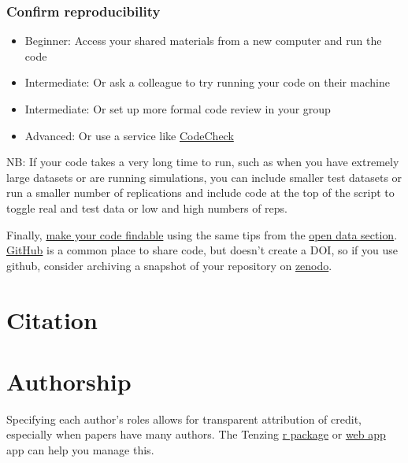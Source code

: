 \documentclass[
  oneside]{book}
\providecommand{\tightlist}{%
  \setlength{\itemsep}{0pt}\setlength{\parskip}{0pt}}
\begin{document}
\hypertarget{confirm-reproducibility}{%
\subsection{Confirm reproducibility}\label{confirm-reproducibility}}

\begin{itemize}
\tightlist
\item
  {Beginner}: Access your shared materials from a new computer and run the code
\item
  {Intermediate}: Or ask a colleague to try running your code on their machine
\item
  {Intermediate}: Or set up more formal code review \citep{vable2021code} in your group
\item
  {Advanced}: Or use a service like \href{https://codecheck.org.uk/}{CodeCheck}
\end{itemize}

NB: If your code takes a very long time to run, such as when you have extremely large datasets or are running simulations, you can include smaller test datasets or run a smaller number of replications and include code at the top of the script to toggle real and test data or low and high numbers of reps.

Finally, \protect\hyperlink{make-it-findable}{make your code findable} using the same tips from the \protect\hyperlink{open-data}{open data section}. \href{https://github.com/}{GitHub} is a common place to share code, but doesn't create a DOI, so if you use github, consider archiving a snapshot of your repository on \href{https://docs.github.com/en/repositories/archiving-a-github-repository/referencing-and-citing-content}{zenodo}.

\hypertarget{citation-1}{%
\chapter{Citation}\label{citation-1}}

\hypertarget{authorship-1}{%
\chapter{Authorship}\label{authorship-1}}

Specifying each author's roles allows for transparent attribution of credit, especially when papers have many authors. The Tenzing \href{https://marton-balazs-kovacs.github.io/tenzing/}{r package} or \href{https://tenzing.club/}{web app} app can help you manage this.
\end{document}
